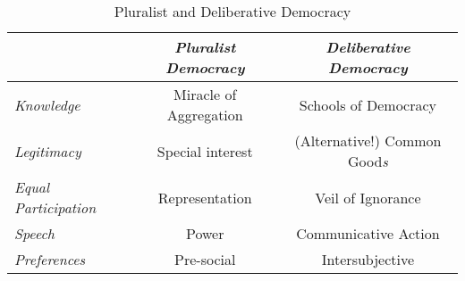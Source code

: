 
\begin{table}
	\caption{Pluralist and Deliberative Democracy}
	\label{tab:pluralist-vs-deliberative}
	\small
	\begin{center}
	\begin{tabular}{lcc}
		\toprule 
		 & \emph{Pluralist Democracy} & \emph{Deliberative Democracy}\\
		\midrule
		\emph{Knowledge} & Miracle of Aggregation & Schools of Democracy \\ [10pt]
		\emph{Legitimacy} & Special interest & (Alternative!) Common Good\emph{s} \\ [10pt]
		\emph{Equal Participation} & Representation & Veil of Ignorance \\ [10pt]
		\emph{Speech} & Power & Communicative Action \\ [10pt]
		\emph{Preferences} & Pre-social & Intersubjective\\
		\bottomrule
	\end{tabular}
	\end{center}
\end{table}